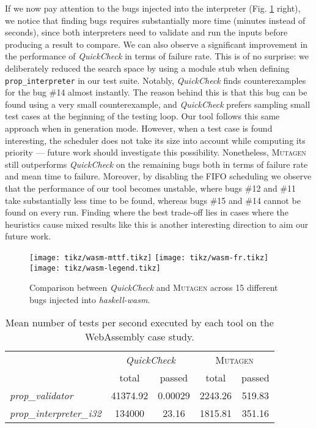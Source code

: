 \documentclass[sigconf, anonymous, review]{acmart}
\newcommand{\quickcheck}{\textit{QuickCheck}\xspace}
\newcommand{\mutagen}{\textsc{Mutagen}\xspace}
\begin{document}
If we now pay attention to the bugs injected into the interpreter (Fig.
\ref{fig:results:wasm} right), we notice that finding bugs requires
substantially more time (minutes instead of seconds), since both interpreters
need to validate and run the inputs before producing a result to compare.
%
We can also observe a significant improvement in the performance of \quickcheck
in terms of failure rate.
%
This is of no surprise: we deliberately reduced the search space by using a
module stub when defining \texttt{prop\_interpreter} in our test suite.
%
Notably, \quickcheck finds counterexamples for the bug \#14 almost instantly.
%
The reason behind this is that this bug can be found using a very small
counterexample, and \quickcheck prefers sampling small test cases at the
beginning of the testing loop.
%
Our tool follows this same approach when in generation mode.
%
However, when a test case is found interesting, the scheduler does not take its
size into account while computing its priority --- future work should
investigate this possibility.
%
Nonetheless, \mutagen still outperforms \quickcheck on the remaining bugs both
in terms of failure rate and mean time to failure.
%
Moreover, by disabling the FIFO scheduling we observe that the performance of
our tool becomes unstable, where bugs \#12 and \#11 take substantially less time
to be found, whereas bugs \#15 and \#14 cannot be found on every run.
%
Finding where the best trade-off lies in cases where the heuristics cause mixed
results like this is another interesting direction to aim our future work.

\begin{figure}[t]
  \centering
  \texttt{[image: tikz/wasm-mttf.tikz]}
  \texttt{[image: tikz/wasm-fr.tikz]}\vspace{-5pt}
  \texttt{[image: tikz/wasm-legend.tikz]}
  \vspace{-20pt}
  \caption{\label{fig:results:wasm} Comparison between \quickcheck and \mutagen
    across 15 different bugs injected into \textit{haskell-wasm}. }
\end{figure}

\begin{table}[t]
\footnotesize
\begin{tabular}{|l|c|c|c|c|}
\hline
\multicolumn{1}{|c|}{
  \multirow{2}{*}{Property}}
  & \multicolumn{2}{c|}{\quickcheck}
  & \multicolumn{2}{c|}{\mutagen} \\
  \cline{2-5}
  \multicolumn{1}{|c|}{}
  & \multicolumn{1}{c|}{total}
  & passed
  & \multicolumn{1}{c|}{total}
  & passed \\
\hline
\textit{prop\_validator}
& 41374.92
& 0.00029
& 2243.26
& 519.83\\
\hline
\textit{prop\_interpreter\_i32}
& 134000
& 23.16
& 1815.81
& 351.16 \\
\hline
\end{tabular}
\caption{\label{table:wasm:overhead}Mean number of tests per second executed by
  each tool on the WebAssembly case study.}
\vspace{-10pt}
\end{table}
\end{document}
